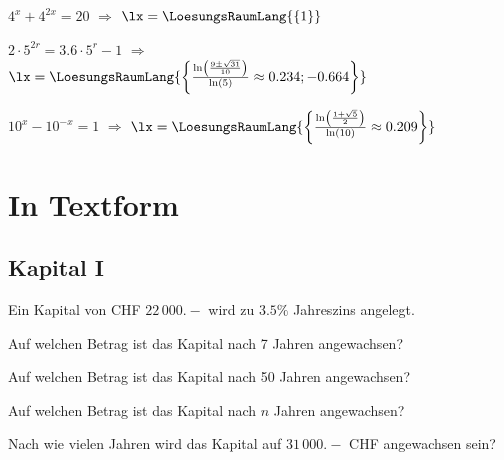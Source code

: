 \begin{bbwAufgabenBlock}
\item $4^x + 4^{2x} = 20$ $\Longrightarrow$ $\lx=\LoesungsRaumLang{\{  1   \}}$ \plz{}
\item $2\cdot{}5^{2r} = 3.6\cdot{}5^r - 1$ $\Longrightarrow$
$\lx=\LoesungsRaumLang{\left\{   \frac{\ln\left(\frac{9\pm\sqrt{31}}{10}\right)}{\ln(5)} \approx
0.234; -0.664 \right\}
}$


\item $10^x - 10^{-x} = 1$ $\Longrightarrow$ $\lx=\LoesungsRaumLang{\left\{  \frac{\ln\left(\frac{1+\sqrt{5}}{2}\right)}{\ln(10)} \approx  0.209   \right\}}$ 

\end{bbwAufgabenBlock}
\platzFuerBerechnungenBisEndeSeite{}

\newpage
\section{In Textform}
\subsection{Kapital I}
Ein Kapital von CHF $22\,000.-$ wird zu $3.5\%$ Jahreszins angelegt.
\begin{bbwAufgabenBlock}
\item Auf welchen Betrag ist das Kapital nach 7 Jahren
angewachsen? \plz{}
\item Auf welchen Betrag ist das Kapital nach 50 Jahren
angewachsen?  \plz{}
\item Auf welchen Betrag ist das Kapital nach $n$ Jahren
angewachsen?  \plz{} \noTRAINER{\newpage}
\item Nach wie vielen Jahren wird das Kapital auf $31\,000.-$ CHF
angewachsen sein?  \plz{}
\end{bbwAufgabenBlock}
\platzFuerBerechnungenBisEndeSeite{}
